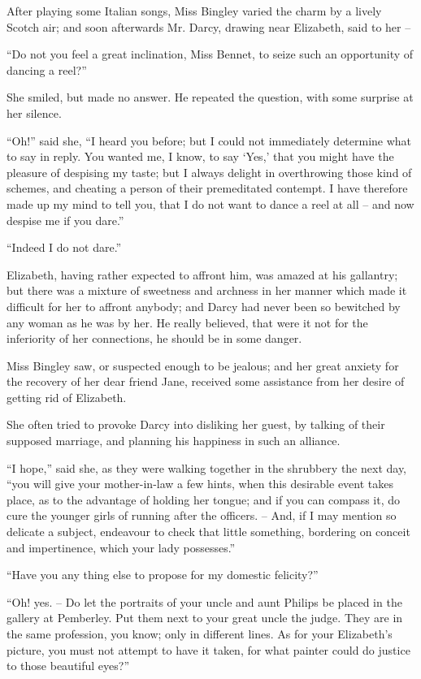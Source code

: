 After playing some Italian songs, Miss Bingley varied
the charm by a lively Scotch air; and soon afterwards
Mr. Darcy, drawing near Elizabeth, said to her --

“Do not you feel a great inclination, Miss Bennet, to
seize such an opportunity of dancing a reel?”

She smiled, but made no answer. He repeated the
question, with some surprise at her silence.

“Oh!” said she, “I heard you before; but I could not
immediately determine what to say in reply. You wanted
me, I know, to say ‘Yes,’ that you might have the pleasure
of despising my taste; but I always delight in overthrowing
those kind of schemes, and cheating a person of their
premeditated contempt. I have therefore made up my
mind to tell you, that I do not want to dance a reel at all -- and
now despise me if you dare.”

“Indeed I do not dare.”

Elizabeth, having rather expected to affront him, was
amazed at his gallantry; but there was a mixture of
sweetness and archness in her manner which made it
difficult for her to affront anybody; and Darcy had never
been so bewitched by any woman as he was by her. He
really believed, that were it not for the inferiority of her
connections, he should be in some danger.

Miss Bingley saw, or suspected enough to be jealous;
and her great anxiety for the recovery of her dear friend
Jane, received some assistance from her desire of getting
rid of Elizabeth.

She often tried to provoke Darcy into disliking her
guest, by talking of their supposed marriage, and planning
his happiness in such an alliance.

“I hope,” said she, as they were walking together in
the shrubbery the next day, “you will give your mother-in-law
a few hints, when this desirable event takes place,
as to the advantage of holding her tongue; and if you
can compass it, do cure the younger girls of running after
the officers. -- And, if I may mention so delicate a subject,
endeavour to check that little something, bordering on
conceit and impertinence, which your lady possesses.”

“Have you any thing else to propose for my domestic
felicity?”

“Oh! yes. -- Do let the portraits of your uncle and aunt
Philips be placed in the gallery at Pemberley. Put them
next to your great uncle the judge. They are in the
same profession, you know; only in different lines. As for
your Elizabeth’s picture, you must not attempt to have it
taken, for what painter could do justice to those beautiful
eyes?”

